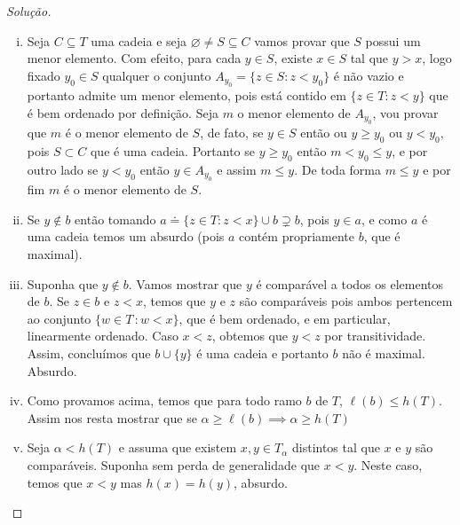 \documentclass[a4paper]{article}
\theoremstyle{plain}\newtheorem{teo}{Teorema}[section]
\theoremstyle{plain}\newtheorem{prop}[teo]{Proposição}
\theoremstyle{plain}\newtheorem{lem}[teo]{Lema}
\theoremstyle{plain}\newtheorem{cor}[teo]{Corolário}
\theoremstyle{definition}\newtheorem{defi}[teo]{Definição}
\theoremstyle{remark}\newtheorem{rem}[teo]{Observação}
\theoremstyle{definition}\newtheorem{example}[teo]{Exemplo}
\theoremstyle{remark}\newtheorem{step}{\bf Step}
\begin{document}
  \begin{proof}[Solução]\hfill
    \begin{enumerate}[(i)]
      \item  Seja \(C\subseteq T\) uma cadeia e seja
        \(\varnothing\not = S\subseteq C\) vamos provar que \(S\) possui um menor
        elemento. Com efeito, para cada \(y\in S\), existe \(x\in S\) tal que \(y >x\), logo fixado $y_0\in S$ qualquer o conjunto $A_{y_0} =\{z\in S: z<y_{0}\}$ é não vazio e portanto admite um menor elemento, pois está contido em $\{z\in T: z<y\}$ que é bem ordenado por definição. Seja $m$ o menor elemento de $A_{y_0}$, vou provar que $m$ é o menor elemento de $S$, de fato, se $y\in S$ então ou $y\geq y_0$ ou $y<y_0$, pois $S\subset C$ que é uma cadeia.
        Portanto se $y\geq y_0$ então $m<y_0\leq y$, e por outro lado se $y<y_0$ então $y\in A_{y_0}$ e assim $m\leq y$. De toda forma $m\leq y$ e por fim $m$ é o menor elemento de $S$.
      \item Se $y\notin b$ então tomando $a\doteq\{z\in T: z<x\}\cup b\supsetneq b$, pois $y\in a$, e como $a$ é uma cadeia temos um absurdo (pois $a$ contém propriamente $b$, que é maximal).
      \item Suponha que \(y\not\in b\). Vamos mostrar que \(y\) é comparável
        a todos os elementos de \(b\). Se \(z\in b\) e \(z < x\), temos que
        \(y\) e \(z\) são comparáveis pois ambos pertencem ao conjunto \(\{w\in
        T\,\colon w< x \}\), que é bem ordenado, e em particular, linearmente
        ordenado. Caso \(x<z\), obtemos que \(y<z\) por transitividade. Assim,
        concluímos que \(b\cup\{y\}\) é uma cadeia e portanto \(b\) não é
        maximal. Absurdo.
      \item Como provamos acima, temos que para
todo ramo \(b\) de \(T\), \(\ell (b)\leq h(T)\). 
Assim nos resta mostrar que se $\alpha\geq \ell (b)\implies \alpha\geq h(T)$ 
        \item Seja \(\alpha < h(T)\) e assuma que existem \(x,y\in T_\alpha\)
          distintos tal que \(x\) e \(y\) são comparáveis.
          Suponha sem perda de generalidade que
      \(x<y\). Neste caso, temos que \(x<y\) mas \(h(x)=h(y)\), absurdo.\qedhere
  \end{enumerate}
  \end{proof}
\end{document}
